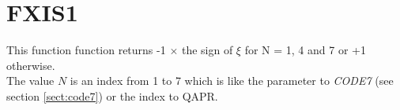 \section{FXIS1}
\label{sect:fxis1}

\noindent This function function returns -1 $\times$ the sign of $\xi$ for N
= 1, 4 and 7 or +1 otherwise.\\

\noindent The value $N$ is an index from 1 to 7 which is like the parameter
to {\em CODE7} (see section \ref{sect:code7}) or the index to QAPR.\\


